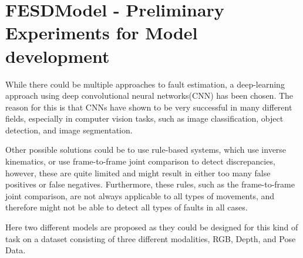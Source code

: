 \chapter[FESDModel]{FESDModel - Preliminary Experiments for Model development}
\label{sec:model_development}

While there could be multiple approaches to fault estimation, a deep-learning approach using deep convolutional neural networks(CNN) has been chosen. The reason for this is that CNNs have shown to be very successful in many different fields, especially in computer vision tasks, such as image classification, object detection, and image segmentation.

Other possible solutions could be to use rule-based systems, which use inverse kinematics, or use frame-to-frame joint comparison to detect discrepancies, however, these are quite limited and might result in either too many false positives or false negatives. Furthermore, these rules, such as the frame-to-frame joint comparison, are not always applicable to all types of movements, and therefore might not be able to detect all types of faults in all cases.

Here two different models are proposed as they could be designed for this kind of task on a dataset consisting of three different modalities, RGB, Depth, and Pose Data.



